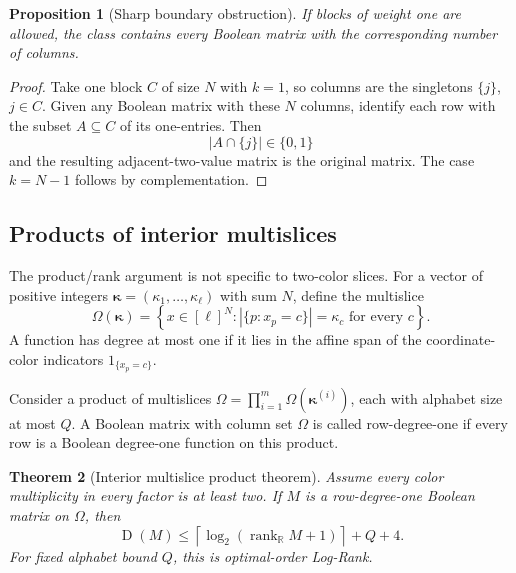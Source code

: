 \documentclass[11pt]{article}
\newtheorem{theorem}{Theorem}[section]
\newtheorem{proposition}[theorem]{Proposition}
\theoremstyle{definition}
\theoremstyle{remark}
\newcommand{\R}{\mathbb R}
\newcommand{\1}{\mathbf 1}
\newcommand{\rank}{\operatorname{rank}}
\newcommand{\Dcc}{\operatorname{D}}
\begin{document}
\begin{proposition}[Sharp boundary obstruction]\label{prop:boundary}
If blocks of weight one are allowed, the class contains every Boolean matrix
with the corresponding number of columns.
\end{proposition}

\begin{proof}
Take one block $C$ of size $N$ with $k=1$, so columns are the singletons
$\{j\}$, $j\in C$.  Given any Boolean matrix with these $N$ columns, identify
each row with the subset $A\subseteq C$ of its one-entries.  Then
\[
 |A\cap\{j\}|\in\{0,1\}
\]
and the resulting adjacent-two-value matrix is the original matrix.  The case
$k=N-1$ follows by complementation.
\end{proof}

\subsection{Products of interior multislices}

The product/rank argument is not specific to two-color slices.  For a vector
of positive integers $\boldsymbol\kappa=(\kappa_1,\ldots,\kappa_\ell)$ with
sum $N$, define the multislice
\[
 \Omega(\boldsymbol\kappa)
 =\left\{x\in[\ell]^N:
   |\{p:x_p=c\}|=\kappa_c\text{ for every }c\right\}.
\]
A function has degree at most one if it lies in the affine span of the
coordinate-color indicators $1_{\{x_p=c\}}$.

Consider a product of multislices
$\Omega=\prod_{i=1}^m\Omega(\boldsymbol\kappa^{(i)})$, each with alphabet
size at most $Q$.  A Boolean matrix with column set $\Omega$ is called
row-degree-one if every row is a Boolean degree-one function on this product.

\begin{theorem}[Interior multislice product theorem]
\label{thm:multislice}
Assume every color multiplicity in every factor is at least two.  If $M$ is a
row-degree-one Boolean matrix on $\Omega$, then
\[
 \Dcc(M)\le
 \left\lceil\log_2(\rank_{\R}M+1)\right\rceil+Q+4.
\]
For fixed alphabet bound $Q$, this is optimal-order Log-Rank.
\end{theorem}
\end{document}

